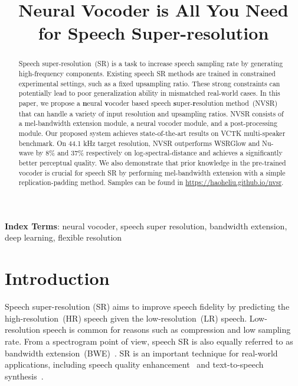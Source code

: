\documentclass[a4paper]{article}
\title{Neural Vocoder is All You Need for Speech Super-resolution}
\begin{document}
\maketitle
\begin{abstract}
Speech super-resolution~(SR) is a task to increase speech sampling rate by generating high-frequency components. Existing speech SR methods are trained in constrained experimental settings, such as a fixed upsampling ratio. These strong constraints can potentially lead to poor generalization ability in mismatched real-world cases. In this paper, we propose a \textbf{n}eural \textbf{v}ocoder based speech \textbf{s}uper-\textbf{r}esolution method~(NVSR) that can handle a variety of input resolution and upsampling ratios. NVSR consists of a mel-bandwidth extension module, a neural vocoder module, and a post-processing module. Our proposed system achieves state-of-the-art results on VCTK multi-speaker benchmark. On \num{44.1} kHz target resolution, NVSR outperforms WSRGlow and Nu-wave by \num{8}\% and \num{37}\% respectively on log-spectral-distance and achieves a significantly better perceptual quality. We also demonstrate that prior knowledge in the pre-trained vocoder is crucial for speech SR by performing mel-bandwidth extension with a simple replication-padding method. Samples can be found in {\small \url{https://haoheliu.github.io/nvsr}}.

\end{abstract}



\noindent\textbf{Index Terms}: neural vocoder, speech super resolution, bandwidth extension, deep learning, flexible resolution

\section{Introduction}
Speech super-resolution (SR) aims to improve speech fidelity by predicting the high-resolution~(HR) speech given the low-resolution~(LR) speech. Low-resolution speech is common for reasons such as compression and low sampling rate. From a spectrogram point of view, speech SR is also equally referred to as bandwidth extension~(BWE)~\cite{BWE-ekstrand2002bandwidth}. SR is an important technique for real-world applications, including speech quality enhancement~\cite{chennoukh2001speech} and text-to-speech synthesis~\cite{nakamura2014mel}. 
\end{document}
